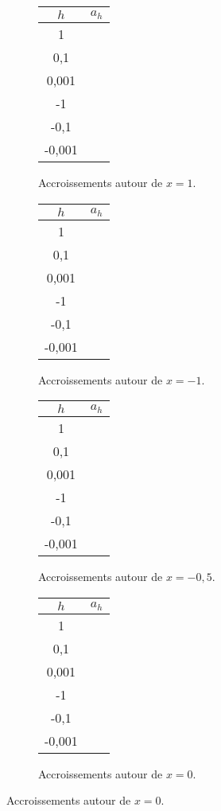 \begin{figure}[h!]
	\centering
	\begin{subfigure}{0.2\textwidth}
	\begin{tabular}{|c|c|}\hline
		$h$ & $a_h$ \\ \hline
		1 & \hspace{1cm} \\ \hline
		0,1 & \\ \hline
		0,001 & \\ \hline
		-1 & \\ \hline
		-0,1 & \\ \hline
		-0,001 & \\ \hline
	\end{tabular}
	\caption{Accroissements autour de $x=1$.}
	\label{fig:1a}
	\end{subfigure}
	\hfill
	\begin{subfigure}{0.2\textwidth}
	\begin{tabular}{|c|c|}\hline
		$h$ & $a_h$ \\ \hline
		1 & \hspace{1cm} \\ \hline
		0,1 & \\ \hline
		0,001 & \\ \hline
		-1 & \\ \hline
		-0,1 & \\ \hline
		-0,001 & \\ \hline
	\end{tabular}
	\caption{Accroissements autour de $x=-1$.}
	\label{fig:1b}
	\end{subfigure}
	\hfill
	\begin{subfigure}{0.2\textwidth}
	\begin{tabular}{|c|c|}\hline
		$h$ & $a_h$ \\ \hline
		1 & \hspace{1cm} \\ \hline
		0,1 & \\ \hline
		0,001 & \\ \hline
		-1 & \\ \hline
		-0,1 & \\ \hline
		-0,001 & \\ \hline
	\end{tabular}
	\caption{Accroissements autour de $x=-0,5$.}
	\label{fig:1c}
	\end{subfigure}
	\hfill
	\begin{subfigure}{0.2\textwidth}
	\begin{tabular}{|c|c|}\hline
		$h$ & $a_h$ \\ \hline
		1 & \hspace{1cm} \\ \hline
		0,1 & \\ \hline
		0,001 & \\ \hline
		-1 & \\ \hline
		-0,1 & \\ \hline
		-0,001 & \\ \hline
	\end{tabular}
	\caption{Accroissements autour de $x=0$.}
	\label{fig:1d}
	\end{subfigure}
	

\end{figure}
